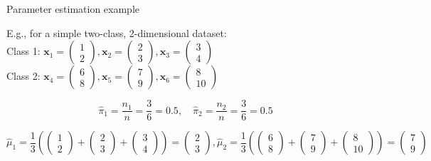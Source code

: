 \documentclass[11pt,compress,t,notes=noshow, xcolor=table]{beamer}
\begin{document}
\begin{vbframe}{Parameter estimation example}
\begin{small}
E.g., for a simple two-class, 2-dimensional dataset: \\
Class 1: $\mathbf{x}_1 = \begin{pmatrix} 1 \\ 2 \end{pmatrix}, \mathbf{x}_2 = \begin{pmatrix} 2 \\ 3 \end{pmatrix}, \mathbf{x}_3 = \begin{pmatrix} 3 \\ 4 \end{pmatrix}$\\
Class 2: $\mathbf{x}_4 = \begin{pmatrix} 6 \\ 8 \end{pmatrix}, \mathbf{x}_5 = \begin{pmatrix} 7 \\ 9 \end{pmatrix}, \mathbf{x}_6 = \begin{pmatrix} 8 \\ 10 \end{pmatrix}$

\[
\hat{\pi}_1 = \frac{n_1}{n} = \frac{3}{6} = 0.5, \quad \hat{\pi}_2 = \frac{n_2}{n} = \frac{3}{6} = 0.5
\]

\[
\hat{\mu}_1 = \frac{1}{3} \left( \begin{pmatrix} 1 \\ 2 \end{pmatrix} + \begin{pmatrix} 2 \\ 3 \end{pmatrix} + \begin{pmatrix} 3 \\ 4 \end{pmatrix} \right) = \begin{pmatrix} 2 \\ 3 \end{pmatrix}, \hat{\mu}_2 = \frac{1}{3} \left( \begin{pmatrix} 6 \\ 8 \end{pmatrix} + \begin{pmatrix} 7 \\ 9 \end{pmatrix} + \begin{pmatrix} 8 \\ 10 \end{pmatrix} \right) = \begin{pmatrix} 7 \\ 9 \end{pmatrix}
\]


\end{small}
\end{vbframe}
\end{document}
